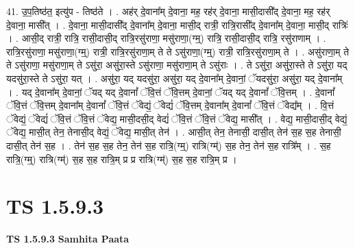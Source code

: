 \documentclass[17pt]{extarticle}
\begin{document}
41. उ॒प॒तिष्ठ॑त॒ इत्यु॑प - तिष्ठ॑ते । . अह॑र् दे॒वाना᳚म् दे॒वाना॒ मह॒ रह॑र् दे॒वाना॒ मासी॒दासी᳚द् दे॒वाना॒ मह॒ रह॑र् दे॒वाना॒ मासी᳚त् । . दे॒वाना॒ मासी॒दासी᳚द् दे॒वाना᳚म् दे॒वाना॒ मासी॒द् रात्री॒ रात्रि॒रासी᳚द् दे॒वाना᳚म् दे॒वाना॒ मासी॒द् रात्रिः॑ । . आसी॒द् रात्री॒ रात्रि॒ रासी॒दासी॒द् रात्रि॒रसु॑राणा॒ मसु॑राणा॒(ग्म्॒) रात्रि॒ रासी॒दासी॒द् रात्रि॒ रसु॑राणाम् । . रात्रि॒रसु॑राणा॒ मसु॑राणा॒(ग्म्॒) रात्री॒ रात्रि॒रसु॑राणा॒म् ते ते ऽसु॑राणा॒(ग्म्॒) रात्री॒ रात्रि॒रसु॑राणा॒म् ते । . असु॑राणा॒म् ते ते ऽसु॑राणा॒ मसु॑राणा॒म् ते ऽसु॑रा॒ असु॑रा॒स्ते ऽसु॑राणा॒ मसु॑राणा॒म् ते ऽसु॑राः । . ते ऽसु॑रा॒ असु॑रा॒स्ते ते ऽसु॑रा॒ यद् यदसु॑रा॒स्ते ते ऽसु॑रा॒ यत् । . असु॑रा॒ यद् यदसु॑रा॒ असु॑रा॒ यद् दे॒वाना᳚म् दे॒वानां॒ ॅयदसु॑रा॒ असु॑रा॒ यद् दे॒वाना᳚म् । . यद् दे॒वाना᳚म् दे॒वानां॒ ॅयद् यद् दे॒वानां᳚ ॅवि॒त्तं ॅवि॒त्तम् दे॒वानां॒ ॅयद् यद् दे॒वानां᳚ ॅवि॒त्तम् । . दे॒वानां᳚ ॅवि॒त्तं ॅवि॒त्तम् दे॒वाना᳚म् दे॒वानां᳚ ॅवि॒त्तं ॅवेद्यं॒ ॅवेद्यं॑ ॅवि॒त्तम् दे॒वाना᳚म् दे॒वानां᳚ ॅवि॒त्तं ॅवेद्य᳚म् । . वि॒त्तं ॅवेद्यं॒ ॅवेद्यं॑ ॅवि॒त्तं ॅवि॒त्तं ॅवेद्य॒ मासी॒दसी॒द् वेद्यं॑ ॅवि॒त्तं ॅवि॒त्तं ॅवेद्य॒ मासी᳚त् । . वेद्य॒ मासी॒दासी॒द् वेद्यं॒ ॅवेद्य॒ मासी॒त् तेन॒ तेनासी॒द् वेद्यं॒ ॅवेद्य॒ मासी॒त् तेन॑ । . आसी॒त् तेन॒ तेनासी॒ दासी॒त् तेन॑ स॒ह स॒ह तेनासी॒ दासी॒त् तेन॑ स॒ह । . तेन॑ स॒ह स॒ह तेन॒ तेन॑ स॒ह रात्रि॒(ग्म्॒) रात्रि(ग्म्॑) स॒ह तेन॒ तेन॑ स॒ह रात्रि᳚म् । . स॒ह रात्रि॒(ग्म्॒) रात्रि(ग्म्॑) स॒ह स॒ह रात्रि॒म् प्र प्र रात्रि(ग्म्॑) स॒ह स॒ह रात्रि॒म् प्र । \newline
\pagebreak
{}

\section{ TS 1.5.9.3 }

\textbf{TS 1.5.9.3 } \newline
\textbf{Samhita Paata} \newline
\end{document}
